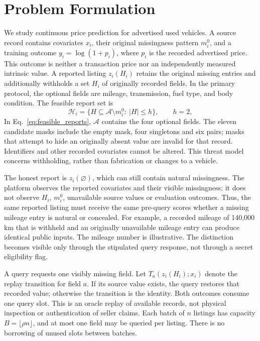 \section{Problem Formulation}
We study continuous price prediction for advertised used vehicles. A source
record contains covariates $x_i$, their original missingness pattern $m_i^0$,
and a training outcome $y_i=\log(1+p_i)$, where $p_i$ is the recorded advertised
price. This outcome is neither a transaction price nor an independently
measured intrinsic value. A reported listing $z_i(H_i)$ retains the original
missing entries and additionally withholds a set $H_i$ of originally recorded
fields. In the primary protocol, the optional fields are mileage,
transmission, fuel type, and body condition. The feasible report set is
\begin{equation}
\mathcal H_i=\{H\subseteq\mathcal A\setminus m_i^0:\ |H|\leq h\},
\qquad h=2,
\label{eq:feasible_reports}
\end{equation}
In Eq.~\eqref{eq:feasible_reports}, $\mathcal A$ contains the four optional
fields. The eleven candidate
masks include the empty mask, four singletons and six pairs; masks that
attempt to hide an originally absent value are invalid for that record.
Identifiers and other recorded covariates cannot be altered. This threat
model concerns withholding, rather than fabrication or changes to a vehicle.

The honest report is $z_i(\varnothing)$, which can still contain natural
missingness. The platform observes the reported covariates and their visible
missingness; it does not observe $H_i$, $m_i^0$, unavailable source values or
evaluation outcomes. Thus, the same reported listing must receive the same
pre-query scores whether a missing mileage entry is natural or concealed.
For example, a recorded mileage of 140,000 km that is withheld and an
originally unavailable mileage entry can produce identical public inputs.
The mileage number is illustrative. The distinction becomes visible only
through the stipulated query response, not through a secret eligibility flag.

A query requests one visibly missing field. Let $T_a(z_i(H_i);x_i)$ denote
the replay transition for field $a$. If its source value exists, the query
restores that recorded value; otherwise the transition is the identity.
Both outcomes consume one query slot. This is an oracle replay of available
records, not physical inspection or authentication of seller claims.
Each batch of $n$ listings has capacity $B=\lfloor\rho n\rfloor$, and at most
one field may be queried per listing. There is no borrowing of unused slots
between batches.

